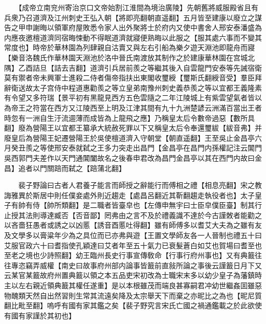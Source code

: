 　　【成帝立南兖州寄治京口文帝始割江淮間為境治廣陵】先朝舊將威服殿省且有兵衆乃召道濟及江州刺史王弘入朝【將即亮翻朝直遥翻】五月皆至建康以廢立之謀告之甲申謝晦以領軍府屋敗悉令家人出外聚將士於府内又使中書舍人邢安泰潘盛為内應夜邀檀道濟同宿晦悚動不得眠道濟就寢便熟晦以此服之【服其處六事而不變其常度也】時帝於華林園為列肆親自沽賣又與左右引船為樂夕遊天淵池即龍舟而寢【樂音洛魏氏作華林園天淵池於洛中晉氏南渡放其制作之於建康華林園在宫城北隅】乙酉詰旦【詰去吉翻】道濟引兵居前羨之等繼其後入自雲龍門安泰等先誡宿衛莫有禦者帝未興軍士進殺二侍者傷帝指扶出東閣收璽綬【璽斯氏翻綬音受】羣臣拜辭衛送故太子宫侍中程道惠勸羨之等立皇弟南豫州刺史義恭羨之等以宜都王義隆素有令望又多符瑞【景平初有黑龍見西方五色雲隨之二年江陵城上有紫雲望氣者皆以為帝王之符當在西方又江陵西至上明及江津其間有九十九洲楚諺云洲滿百當出王者時忽有一洲自生汙流逥薄而成皆為上龍飛之應】乃稱皇太后令數帝過惡【數所具翻】廢為營陽王以宜都王纂承大統赦死罪以下又稱皇太后令奉還璽紱【紱音弗】并廢皇后為營陽王妃遷營陽王於吳使檀道濟入守朝堂【朝直遥翻】王至吳止金昌亭六月癸丑羨之等使邢安泰就弑之王多力突走出昌門【金昌亭在昌門内孫權記注云閶門吳西郭門夫差作以天門通閶闔故名之後春申君改為昌門金昌亭以其在西門内故曰金昌】追者以門關踣而弑之【踣蒲北翻】

　　裴子野論曰古者人君養子能言而師授之辭能行而傅相之禮【相息亮翻】宋之教誨雅異於斯居中則任僕妾處外則近趨走【處昌呂翻近其靳翻趨走執役者也】太子皇子有帥有侍【帥所類翻】是二職者皆臺皁也【左傳申無宇曰士臣皁僕臣臺】制其行止授其法則導達臧否【否音鄙】罔弗由之言不及於禮義識不達於今古謹敇者能勸之以吝嗇狂愚者或誘之以凶慝【誘音酉慝吐得翻】雖有師傅多以耆艾大夫為之雖有友及文學多以膏粱年少為之具位而已亦弗與遊【王置文學師友各一人晉制也禮五十曰艾服官政六十曰耆指使孔穎達曰艾者年至五十氣力已衰髮蒼白如艾也賀場曰耆至也至老之境也少詩照翻】幼王臨州長史行事宣傳敎命【行事行府州事也】又有典籖往往專恣竊弄威權【南史曰故事府州部内論事皆籖前直敍所論之事後云謹籖日月下又云某官某籖故府州置典籖以領之本五品吏宋初改為士職宋末多以幼少皇子為藩鎮時主以左右親近領典籖其權任遂重】是以本根雖茂而端良甚寡嗣君冲幼世繼姦囬雖惡物醜類天然自出然習則生常其流遠矣降及太宗舉天下而棄之亦昵比之為也【昵尼質翻比毗至翻】嗚呼有國有家其鑑之矣【裴子野究言宋氏亡國之禍通鑑載之於此欲使有國有家謹於其初也】

